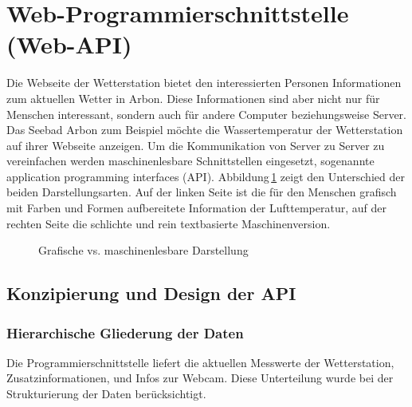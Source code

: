 \section{ Web-Programmierschnittstelle (Web-API)}
Die Webseite der Wetterstation bietet den interessierten Personen Informationen zum aktuellen Wetter in Arbon. Diese Informationen sind aber nicht nur für Menschen interessant, sondern auch für andere Computer beziehungsweise Server. Das Seebad Arbon zum Beispiel möchte die Wassertemperatur der Wetterstation auf ihrer Webseite anzeigen. Um die Kommunikation von Server zu Server zu vereinfachen werden maschinenlesbare Schnittstellen eingesetzt, sogenannte application programming interfaces (API). Abbildung\,\ref{img:humanvsmachine} zeigt den Unterschied der beiden Darstellungsarten. Auf der linken Seite ist die für den Menschen grafisch mit Farben und Formen aufbereitete Information der Lufttemperatur, auf der rechten Seite die schlichte und rein textbasierte Maschinenversion.

\begin{figure}[htbp!]
	\centering
	\caption{Grafische vs. maschinenlesbare Darstellung}
	\label{img:humanvsmachine}
\end{figure}

\subsection{Konzipierung und Design der API}


\subsubsection{Hierarchische Gliederung der Daten}
Die Programmierschnittstelle liefert die aktuellen Messwerte der Wetterstation, Zusatzinformationen, und Infos zur Webcam. Diese Unterteilung wurde bei der Strukturierung der Daten berücksichtigt.



